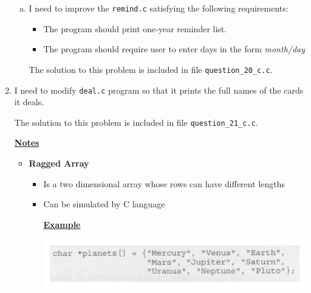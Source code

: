 \documentclass[12pt]{article}
\begin{document}
\begin{enumerate}[1.]
\begin{enumerate}[a)]
        \item

        I need to improve the \texttt{remind.c} satisfying the following requirements:

        \begin{itemize}
            \item The program should print one-year reminder list.
            \item The program should require user to enter days in the form \textit{month/day}
        \end{itemize}

        \bigskip

        The solution to this problem is included in file \texttt{question\_20\_c.c}.

        \bigskip
    \end{enumerate}

    \item

    I need to modify \texttt{deal.c} program so that it prints the full names of the cards
    it deals.

    \bigskip

    The solution to this problem is included in file \texttt{question\_21\_c.c}.

    \bigskip

    \underline{\textbf{Notes}}

    \begin{itemize}
        \item \textbf{Ragged Array}

        \begin{itemize}
            \item Is a two dimensional array whose rows can have different lengths
            \item Can be simulated by C language

            \bigskip

            \underline{\textbf{Example}}

            \bigskip

            \begin{center}
            \includegraphics[width=0.9\linewidth]{images/review_6_solution_9.png}
            \end{center}


\end{itemize}
\end{itemize}
\end{enumerate}
\end{document}
